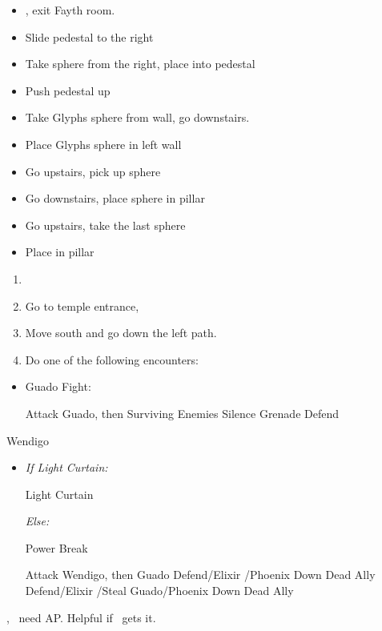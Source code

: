 \begin{trial}
	\begin{itemize}
		\item \save, exit Fayth room.
		\item Slide pedestal to the right
		\item Take sphere from the right, place into pedestal
		\item Push pedestal up
		\item Take Glyphs sphere from wall, go downstairs.
		\item Place Glyphs sphere in left wall
		\item Go upstairs, pick up sphere
		\item Go downstairs, place sphere in pillar
		\item Go upstairs, take the last sphere
		\item Place in pillar
	\end{itemize}
\end{trial}
\begin{enumerate}[resume]
	\item \formation{\rikku}{\tidus}{\yuna}
	\item Go to temple entrance, \sd
	\item Move south and go down the left path.
	      \vfill
	      \newpage
	\item Do one of the following encounters:
\end{enumerate}
\begin{encounters}
	\begin{itemize}
		\item Guado Fight:
		      \begin{itemize}
			      \tidusf Attack Guado, then Surviving Enemies
			      \rikkuf Silence Grenade
			      \yunaf Defend
		      \end{itemize}
	\end{itemize}
\end{encounters}
\begin{battle}[18000]{Wendigo}
	\begin{itemize}
		\tidusf Haste \tidus
		\tidusf Switch Weapon to Brotherhood
		\tidusf Attack Guado B (Top One)
		\item \textit{If Light Curtain:}
		      \begin{itemize}
			      \rikkuf Light Curtain \tidus
		      \end{itemize}
		      \textit{Else:}
		      \begin{itemize}
			      \switch{\rikku}{\auron}
			      \auronf Power Break
		      \end{itemize}
		      \tidusf Attack Wendigo, then Guado
		      \yunaf Defend/Elixir \tidus/Phoenix Down Dead Ally
		      \rikkuf Defend/Elixir \tidus/Steal Guado/Phoenix Down Dead Ally
		      \switch{\yuna}{\lulu}
	\end{itemize}
	\yuna, \tidus\ need AP. Helpful if \lulu\ gets it.
\end{battle}
